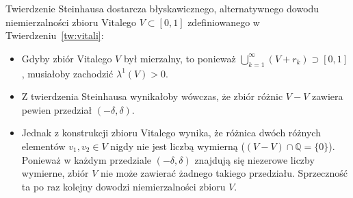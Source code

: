 \begin{uwaga}
    Twierdzenie Steinhausa dostarcza błyskawicznego, alternatywnego dowodu niemierzalności zbioru Vitalego $V \subset [0, 1] $ zdefiniowanego w Twierdzeniu~\ref{tw:vitali}:
    \begin{itemize}
        \item Gdyby zbiór Vitalego $V$ był mierzalny, to ponieważ $\bigcup_{k=1}^\infty (V + r_k) \supset [0, 1]$, musiałoby zachodzić $\lambda^1(V) > 0$.
        \item Z twierdzenia Steinhausa wynikałoby wówczas, że zbiór różnic $V - V$ zawiera pewien przedział $(-\delta, \delta)$.
        \item Jednak z konstrukcji zbioru Vitalego wynika, że różnica dwóch różnych elementów $v_1, v_2 \in V$ nigdy nie jest liczbą wymierną ($(V - V) \cap \mathbb{Q} = \{0\}$). Ponieważ w każdym przedziale $(-\delta, \delta)$ znajdują się niezerowe liczby wymierne, zbiór $V$ nie może zawierać żadnego takiego przedziału. Sprzeczność ta po raz kolejny dowodzi niemierzalności zbioru $V$.
    \end{itemize}
\end{uwaga}
